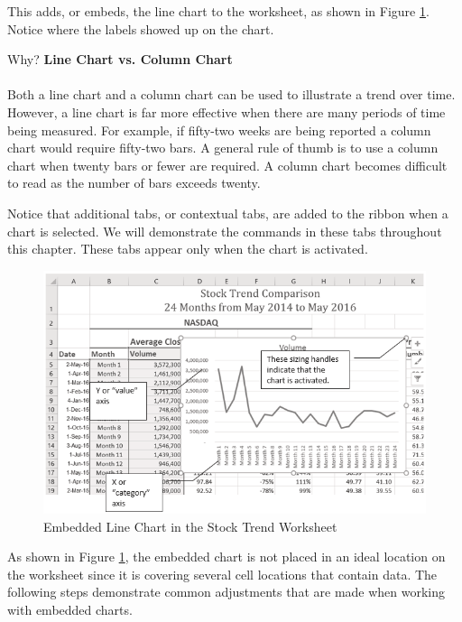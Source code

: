This adds, or embeds, the line chart to the worksheet, as shown in Figure \ref{04:fig03}. Notice where the labels showed up on the chart.

\begin{center}
	\begin{infobox}{Why?}
		\textbf{Line Chart vs. Column Chart}
		\\
		\\
		Both a line chart and a column chart can be used to illustrate a trend over time. However, a line chart is far more effective when there are many periods of time being measured. For example, if fifty-two weeks are being reported a column chart would require fifty-two bars. A general rule of thumb is to use a column chart when twenty bars or fewer are required. A column chart becomes difficult to read as the number of bars exceeds twenty.
	\end{infobox}
\end{center}

Notice that additional tabs, or contextual tabs, are added to the ribbon when a chart is selected. We will demonstrate the commands in these tabs throughout this chapter. These tabs appear only when the chart is activated.

\begin{figure}[H]
	\centering
	\includegraphics[width=\maxwidth{.95\linewidth}]{gfx/ch04_fig03}
	\caption{Embedded Line Chart in the Stock Trend Worksheet}
	\label{04:fig03}
\end{figure}

As shown in Figure \ref{04:fig03}, the embedded chart is not placed in an ideal location on the worksheet since it is covering several cell locations that contain data. The following steps demonstrate common adjustments that are made when working with embedded charts.


